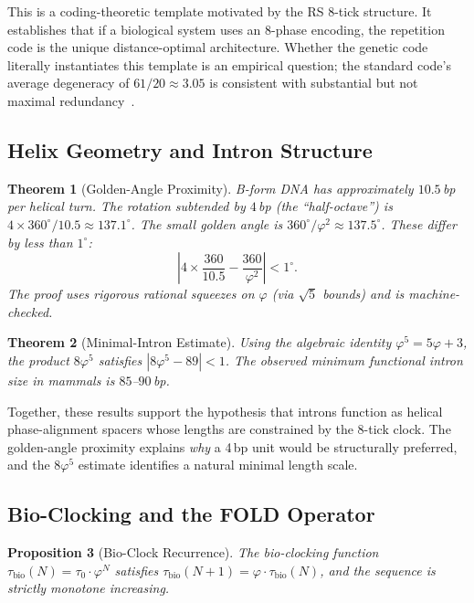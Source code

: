 \documentclass[11pt,a4paper]{article}
\newtheorem{theorem}{Theorem}[section]
\newtheorem{proposition}[theorem]{Proposition}
\newcommand{\ph}{\varphi}
\newcommand{\tick}{\tau_0}
\newcommand{\tbio}{\tau_{\mathrm{bio}}}
\begin{document}
This is a coding-theoretic template motivated by the RS 8-tick structure. It establishes that if a biological system uses an 8-phase encoding, the repetition code is the unique distance-optimal architecture. Whether the genetic code literally instantiates this template is an empirical question; the standard code's average degeneracy of $61/20 \approx 3.05$ is consistent with substantial but not maximal redundancy~\cite{HaigHurst1991, FreelandHurst1998}.

\subsection{Helix Geometry and Intron Structure}

\begin{theorem}[Golden-Angle Proximity]
\label{thm:golden-angle}
B-form DNA has approximately $10.5$\,bp per helical turn. The rotation subtended by $4$\,bp (the ``half-octave'') is $4 \times 360^\circ / 10.5 \approx 137.1^\circ$. The small golden angle is $360^\circ / \ph^2 \approx 137.5^\circ$. These differ by less than $1^\circ$:
\[
\left| 4 \times \frac{360}{10.5} - \frac{360}{\ph^2} \right| < 1^\circ.
\]
The proof uses rigorous rational squeezes on $\ph$ (via $\sqrt{5}$ bounds) and is machine-checked.
\end{theorem}

\begin{theorem}[Minimal-Intron Estimate]
\label{thm:min-intron}
Using the algebraic identity $\ph^5 = 5\ph + 3$, the product $8\ph^5$ satisfies $|8\ph^5 - 89| < 1$. The observed minimum functional intron size in mammals is $85$--$90$\,bp.
\end{theorem}

Together, these results support the hypothesis that introns function as helical phase-alignment spacers whose lengths are constrained by the 8-tick clock. The golden-angle proximity explains \emph{why} a 4\,bp unit would be structurally preferred, and the $8\ph^5$ estimate identifies a natural minimal length scale.

\subsection{Bio-Clocking and the FOLD Operator}

\begin{proposition}[Bio-Clock Recurrence]
\label{prop:bioclock}
The bio-clocking function $\tbio(N) = \tick \cdot \ph^N$ satisfies $\tbio(N+1) = \ph \cdot \tbio(N)$, and the sequence is strictly monotone increasing.
\end{proposition}
\end{document}
